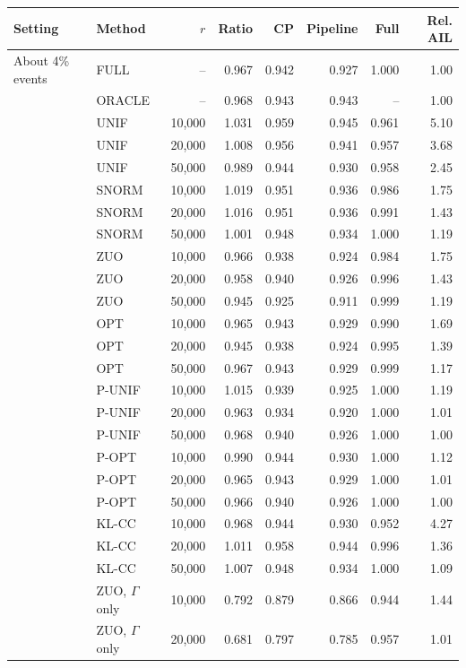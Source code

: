 \begin{tabular}{llrrrrrr}
\toprule
Setting & Method & \(r\) & Ratio & CP & Pipeline & Full & Rel. AIL\\
\midrule
About 4\% events & FULL & -- & 0.967 & 0.942 & 0.927 & 1.000 & 1.00\\
 & ORACLE & -- & 0.968 & 0.943 & 0.943 & -- & 1.00\\
 & UNIF & 10,000 & 1.031 & 0.959 & 0.945 & 0.961 & 5.10\\
 & UNIF & 20,000 & 1.008 & 0.956 & 0.941 & 0.957 & 3.68\\
 & UNIF & 50,000 & 0.989 & 0.944 & 0.930 & 0.958 & 2.45\\
 & SNORM & 10,000 & 1.019 & 0.951 & 0.936 & 0.986 & 1.75\\
 & SNORM & 20,000 & 1.016 & 0.951 & 0.936 & 0.991 & 1.43\\
 & SNORM & 50,000 & 1.001 & 0.948 & 0.934 & 1.000 & 1.19\\
 & ZUO & 10,000 & 0.966 & 0.938 & 0.924 & 0.984 & 1.75\\
 & ZUO & 20,000 & 0.958 & 0.940 & 0.926 & 0.996 & 1.43\\
 & ZUO & 50,000 & 0.945 & 0.925 & 0.911 & 0.999 & 1.19\\
 & OPT & 10,000 & 0.965 & 0.943 & 0.929 & 0.990 & 1.69\\
 & OPT & 20,000 & 0.945 & 0.938 & 0.924 & 0.995 & 1.39\\
 & OPT & 50,000 & 0.967 & 0.943 & 0.929 & 0.999 & 1.17\\
 & P-UNIF & 10,000 & 1.015 & 0.939 & 0.925 & 1.000 & 1.19\\
 & P-UNIF & 20,000 & 0.963 & 0.934 & 0.920 & 1.000 & 1.01\\
 & P-UNIF & 50,000 & 0.968 & 0.940 & 0.926 & 1.000 & 1.00\\
 & P-OPT & 10,000 & 0.990 & 0.944 & 0.930 & 1.000 & 1.12\\
 & P-OPT & 20,000 & 0.965 & 0.943 & 0.929 & 1.000 & 1.01\\
 & P-OPT & 50,000 & 0.966 & 0.940 & 0.926 & 1.000 & 1.00\\
 & KL-CC & 10,000 & 0.968 & 0.944 & 0.930 & 0.952 & 4.27\\
 & KL-CC & 20,000 & 1.011 & 0.958 & 0.944 & 0.996 & 1.36\\
 & KL-CC & 50,000 & 1.007 & 0.948 & 0.934 & 1.000 & 1.09\\
 & ZUO, \(\Gamma\) only & 10,000 & 0.792 & 0.879 & 0.866 & 0.944 & 1.44\\
 & ZUO, \(\Gamma\) only & 20,000 & 0.681 & 0.797 & 0.785 & 0.957 & 1.01\\

\end{tabular}
